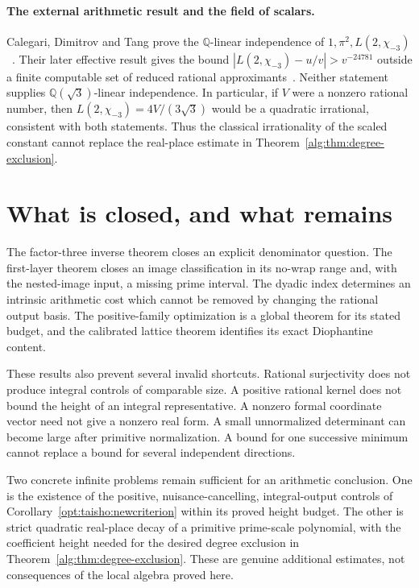\documentclass[11pt,a4paper]{article}
\numberwithin{equation}{section}
\theoremstyle{definition}\newtheorem{definition}[theorem]{Definition}
\theoremstyle{remark}\newtheorem{remark}[theorem]{Remark}
\begin{document}
\paragraph{The external arithmetic result and the field of scalars.}
Calegari, Dimitrov and Tang prove the $\mathbb Q$-linear independence of
$1,\pi^2,L(2,\chi_{-3})$~\cite{CDT24}. Their later effective result gives the bound
$|L(2,\chi_{-3})-u/v|>v^{-24781}$ outside a finite computable set of reduced
rational approximants~\cite{CDT25}. Neither statement supplies
$\mathbb Q(\sqrt3)$-linear independence. In particular, if $V$ were a
nonzero rational number, then
$L(2,\chi_{-3})=4V/(3\sqrt3)$ would be a quadratic irrational, consistent
with both statements. Thus the classical irrationality of the scaled
constant cannot replace the real-place estimate in
Theorem~\ref{alg:thm:degree-exclusion}.



\section{What is closed, and what remains}
The factor-three inverse theorem closes an explicit denominator question.
The first-layer theorem closes an image classification in its no-wrap
range and, with the nested-image input, a missing prime interval.
The dyadic index determines an intrinsic arithmetic cost which cannot
be removed by changing the rational output basis. The positive-family
optimization is a global theorem for its stated budget, and the calibrated
lattice theorem identifies its exact Diophantine content.

These results also prevent several invalid shortcuts. Rational surjectivity
does not produce integral controls of comparable size. A positive rational
kernel does not bound the height of an integral representative. A nonzero
formal coordinate vector need not give a nonzero real form. A small
unnormalized determinant can become large after primitive normalization.
A bound for one successive minimum cannot replace a bound for several
independent directions.

Two concrete infinite problems remain sufficient for an arithmetic conclusion.
One is the existence of the positive, nuisance-cancelling, integral-output
controls of Corollary~\ref{opt:taisho:newcriterion} within its proved height
budget. The other is strict quadratic real-place decay of a primitive
prime-scale polynomial, with the coefficient height needed for the desired
degree exclusion in Theorem~\ref{alg:thm:degree-exclusion}. These are genuine
additional estimates, not consequences of the local algebra proved here.
\end{document}
